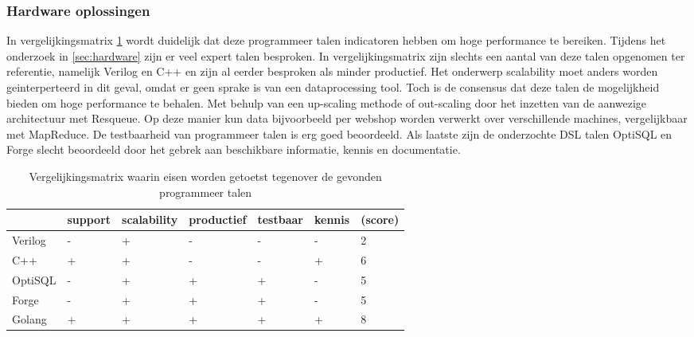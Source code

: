 \clearpage

\subsubsection{\textbf{Hardware oplossingen}}

In vergelijkingsmatrix \ref{tab:matrix_hardware} wordt duidelijk dat deze programmeer talen indicatoren hebben om hoge performance te bereiken. Tijdens het onderzoek in \ref{sec:hardware} zijn er veel expert talen besproken. In vergelijkingsmatrix zijn slechts een aantal van deze talen opgenomen ter referentie, namelijk Verilog en C++ en zijn al eerder besproken als minder productief. Het onderwerp scalability moet anders worden geinterperteerd in dit geval, omdat er geen sprake is van een dataprocessing tool. Toch is de consensus dat deze talen de mogelijkheid bieden om hoge performance te behalen. Met behulp van een up-scaling methode of out-scaling door het inzetten van de aanwezige architectuur met Resqueue. Op deze manier kun data bijvoorbeeld per webshop worden verwerkt over verschillende machines, vergelijkbaar met MapReduce. De testbaarheid van programmeer talen is erg goed beoordeeld. Als laatste zijn de onderzochte DSL talen OptiSQL en Forge slecht beoordeeld door het gebrek aan beschikbare informatie, kennis en documentatie.

\begin{table}[bh]
\caption{Vergelijkingsmatrix waarin eisen worden getoetst tegenover de gevonden programmeer talen}
\label{tab:matrix_hardware}
\begin{tabular}{|p{3cm}|l|l|l|l|l|l|}
\hline
           & support & scalability               & productief & testbaar & kennis &     (score)  \\ \hline
Verilog    & -       & +                         & -          & -        & -      & 2     \\ \hline
C++        & +       & +                         & -          & -        & +      & 6     \\ \hline
OptiSQL    & -       & +                         & +          & +        & -      & 5     \\ \hline
Forge      & -       & +                         & +          & +        & -      & 5     \\ \hline
Golang     & +       & +                         & +          & +        & +      & 8     \\ \hline
\end{tabular}
\end{table}

